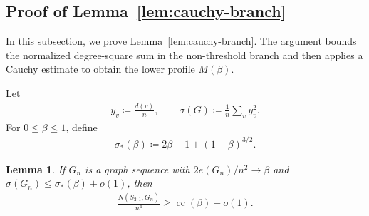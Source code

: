 \documentclass[10pt,a4paper]{article}
\newtheorem{lemma}[definition]{Lemma}
\newcommand{\cc}{\operatorname{cc}}
\begin{document}
\subsection{Proof of Lemma~\ref{lem:cauchy-branch}}\label{subsec:prove-lemma4.2}
In this subsection, we prove Lemma~\ref{lem:cauchy-branch}. The argument bounds the normalized degree-square sum in the non-threshold 
branch and then applies a Cauchy estimate to obtain the lower profile 
$M(\beta)$.

Let
\begin{align*}
  y_v\coloneqq\frac{d(v)}{n},
  \qquad
  \sigma(G)\coloneqq\frac1n\sum_v y_v^2.
\end{align*}
For $0\le\beta\le1$, define
\begin{align}\label{eq:sigma-star}
  \sigma_*(\beta)\coloneqq 2\beta-1+(1-\beta)^{3/2}.
\end{align}

\begin{lemma}\label{lem:cauchy}
If $G_n$ is a graph sequence with $2e(G_n)/n^2\to\beta$ and
$\sigma(G_n)\le\sigma_*(\beta)+o(1)$, then
\begin{align*}
  \frac{N(S_{2,1},G_n)}{n^4}\ge \cc(\beta)-o(1).
\end{align*}
\end{lemma}
\end{document}
